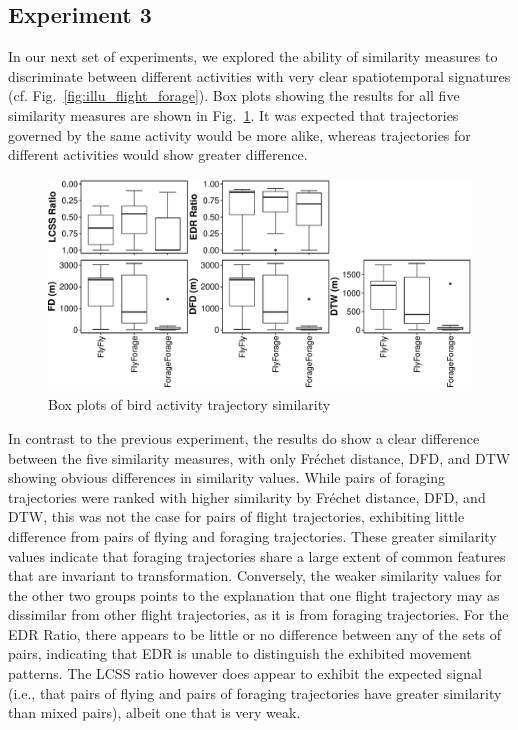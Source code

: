 \documentclass[10pt,letterpaper]{article}
\begin{document}
\subsection{Experiment 3}
\label{par:result_3}
In our next set of experiments, we explored the ability of similarity measures to discriminate between different activities with very clear spatiotemporal signatures (cf. Fig.~\ref{fig:illu_flight_forage}). Box plots showing the results for all five similarity measures are  shown in Fig.~\ref{fig:bird_activity}. It was expected that trajectories governed by the same activity would be more alike, whereas trajectories for different activities would show greater difference. 

\begin{figure}[ht]
	\includegraphics[width=\linewidth]{figures/Exp3}
	\caption{Box plots of bird activity trajectory similarity} \label{fig:bird_activity}
\end{figure}

In contrast to the previous experiment, the results do show a clear difference between the five similarity measures, with only Fréchet distance, DFD, and DTW showing obvious differences in similarity values. While pairs of foraging trajectories were ranked with higher similarity by Fréchet distance, DFD, and DTW, this was not the case for pairs of flight trajectories, exhibiting little difference from pairs of flying and foraging trajectories. These greater similarity values indicate that foraging trajectories share a large extent of common features that are invariant to transformation. Conversely, the weaker similarity values for the other two groups points to  the explanation that one flight trajectory may as dissimilar from other flight trajectories, as it is from foraging trajectories. For the EDR Ratio, there appears to be little or no difference between any of the sets of pairs, indicating that EDR is unable to distinguish the exhibited movement patterns. The LCSS ratio however does appear to exhibit the expected signal (i.e., that pairs of flying and pairs of foraging trajectories have greater similarity than mixed pairs), albeit one that is very weak.
\end{document}
